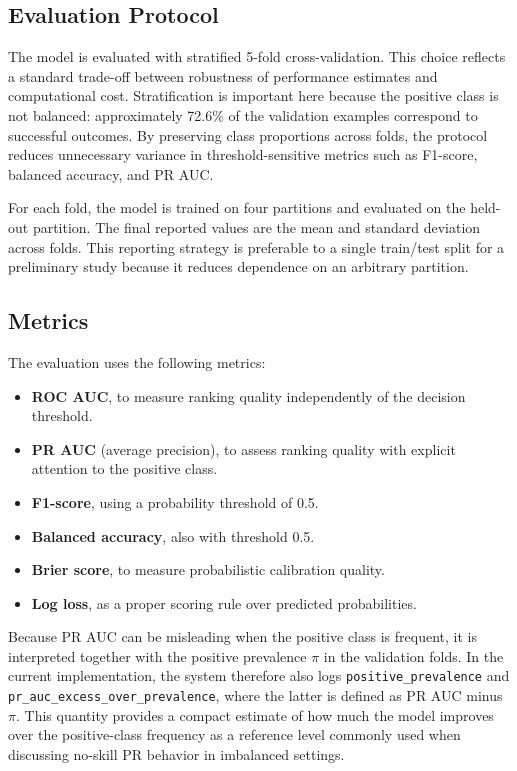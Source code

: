 \documentclass[conference]{IEEEtran}
\begin{document}
\subsection{Evaluation Protocol}
The model is evaluated with stratified 5-fold cross-validation. This choice reflects a standard trade-off between robustness of performance estimates and computational cost. Stratification is important here because the positive class is not balanced: approximately 72.6\% of the validation examples correspond to successful outcomes. By preserving class proportions across folds, the protocol reduces unnecessary variance in threshold-sensitive metrics such as F1-score, balanced accuracy, and PR AUC.

For each fold, the model is trained on four partitions and evaluated on the held-out partition. The final reported values are the mean and standard deviation across folds. This reporting strategy is preferable to a single train/test split for a preliminary study because it reduces dependence on an arbitrary partition.

\subsection{Metrics}
The evaluation uses the following metrics:

\begin{itemize}
  \item \textbf{ROC AUC}, to measure ranking quality independently of the decision threshold.
  \item \textbf{PR AUC} (average precision), to assess ranking quality with explicit attention to the positive class.
  \item \textbf{F1-score}, using a probability threshold of 0.5.
  \item \textbf{Balanced accuracy}, also with threshold 0.5.
  \item \textbf{Brier score}, to measure probabilistic calibration quality.
  \item \textbf{Log loss}, as a proper scoring rule over predicted probabilities.
\end{itemize}

Because PR AUC can be misleading when the positive class is frequent, it is interpreted together with the positive prevalence $\pi$ in the validation folds. In the current implementation, the system therefore also logs \texttt{positive\_prevalence} and \texttt{pr\_auc\_excess\_over\_prevalence}, where the latter is defined as PR AUC minus $\pi$. This quantity provides a compact estimate of how much the model improves over the positive-class frequency as a reference level commonly used when discussing no-skill PR behavior in imbalanced settings.
\end{document}
